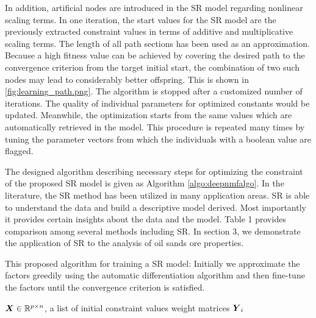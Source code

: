 \documentclass[10pt,journal,compsoc]{IEEEtran}
\begin{document}
In addition, artificial nodes are introduced in the SR model regarding nonlinear scaling terms. In one iteration, the start values for the SR model are the previously extracted constraint values in terms of additive and multiplicative scaling terms. The length of all path sections has been used as an approximation. Because a high fitness value can be achieved by covering the desired path to the convergence criterion from the target initial start, the combination of two such nodes may lead to considerably better offspring. This is shown in \autoref{fig:learning_path.png}. The algorithm is stopped after a customized number of iterations. The quality of individual parameters for optimized constants would be updated. Meanwhile, the optimization starts from the same values which are automatically retrieved in the model. This procedure is repeated many times by tuning the parameter vectors from which the individuals with a boolean value are flagged. 


The designed algorithm describing necessary steps for optimizing the constraint of the proposed SR model is given as Algorithm \autoref{algo:deepnmfalgo}. In the literature, the SR method has been utilized in many application areas. SR is able to understand the data and build a descriptive model derived. Most importantly it provides certain insights about the data and the model. Table 1 provides comparison among several methods including SR. In section 3, we demonstrate the application of SR to the analysis of oil sands ore properties. 


\begin{algorithm}[!htb]
	\caption{This proposed algorithm for training a SR model: Initially we approximate the factors greedily using the automatic differentiation algorithm \cite{ding2010convex} and then fine-tune the factors until the convergence criterion is satisfied.}
	
	\begin{algorithmic}
		\label{algo:deepnmfalgo}
		 {${\boldsymbol{X}} \in \mathbb{R}^{p\times n}$, a list of initial constraint values }
		 {weight matrices ${\boldsymbol{Y}}_i$}
		\STATE {}
		\ENDWHILE
		
		
		
		\REPEAT
		\ENDIF
		
	\end{algorithmic}
\end{algorithm}
\end{document}
